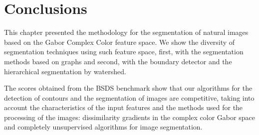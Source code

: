 \section{Conclusions}

This chapter presented the methodology for the segmentation of natural images based on the Gabor Complex Color feature space. We show the diversity of segmentation techniques using such feature space, first, with the segmentation methods based on graphs and second, with the boundary detector and the hierarchical segmentation by watershed.

The scores obtained from the BSDS benchmark show that our algorithms for the detection of contours and the segmentation of images are competitive, taking into account the characteristics of the input features and the methods used for the processing of the images: dissimilarity gradients in the complex color Gabor space and completely unsupervised algorithms for image segmentation.

